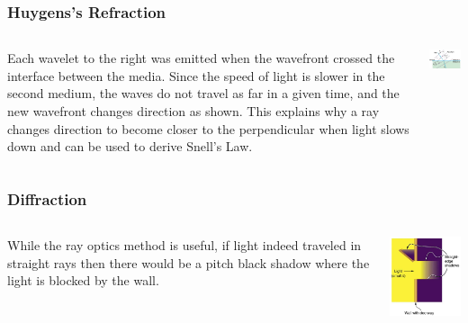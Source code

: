 \documentclass{beamer}
\begin{document}
\begin{frame}\frametitle{Huygens's Refraction}
\begin{columns}
\begin{column}{6cm}
Each wavelet to the right was emitted when the wavefront crossed the interface between the media. Since the speed of light is slower in the second medium, the waves do not travel as far in a given time, and the new wavefront changes direction as shown. This explains why a ray changes direction to become closer to the perpendicular when light slows down and can be used to derive Snell's Law.
\end{column}
\begin{column}{5cm}
\begin{center}
\includegraphics[width=5cm]{fig/huyRefract.jpg}
\end{center}
\end{column}
\end{columns}
\end{frame}

\begin{frame}\frametitle{Diffraction}
\begin{columns}
\begin{column}{6cm}
While the ray optics method is useful, if light indeed traveled in straight rays then there would be a pitch black shadow where the light is blocked by the wall.
\end{column}
\begin{column}{5cm}
\begin{center}
\includegraphics[width=5cm]{fig/doorway.jpg}
\end{center}
\end{column}
\end{columns}
\end{frame}
\end{document}
